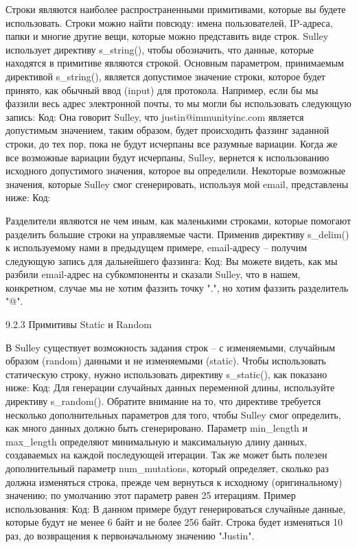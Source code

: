 \documentclass[12pt]{book}
\begin{document}
Строки являются наиболее распространенными примитивами, которые вы будете использовать. Строки можно найти повсюду: имена пользователей, IP-адреса, папки и многие другие вещи, которые можно представить виде строк. Sulley использует директиву s\_string(), чтобы обозначить, что данные, которые находятся в примитиве являются строкой. Основным параметром, принимаемым директивой s\_string(), является допустимое значение строки, которое будет принято, как обычный ввод (input) для протокола. Например, если бы мы фаззили весь адрес электронной почты, то мы могли бы использовать следующую запись:
Код:
Она говорит Sulley, что justin@immunityinc.com является допустимым значением, таким образом, будет происходить фаззинг заданной строки, до тех пор, пока не будут исчерпаны все разумные вариации. Когда же все возможные вариации будут исчерпаны, Sulley, вернется к использованию исходного допустимого значения, которое вы определили. Некоторые возможные значения, которые Sulley смог сгенерировать, используя мой email, представлены ниже:
Код:

Разделители являются не чем иным, как маленькими строками, которые помогают разделить большие строки на управляемые части. Применив директиву s\_delim() к используемому нами в предыдущем примере, email-адресу – получим следующую запись для дальнейшего фаззинга:
Код:
Вы можете видеть, как мы разбили email-адрес на субкомпоненты и сказали Sulley, что в нашем, конкретном, случае мы не хотим фаззить точку ".", но хотим фаззить разделитель "@". 

9.2.3 Примитивы Static и Random

В Sulley существует возможность задания строк – с изменяемыми, случайным образом (random) данными и не изменяемыми (static). Чтобы использовать статическую строку, нужно использовать директиву s\_static(), как показано ниже:
Код:
Для генерации случайных данных переменной длины, используйте директиву s\_random(). Обратите внимание на то, что директиве требуется несколько дополнительных параметров для того, чтобы Sulley смог определить, как много данных должно быть сгенерировано. Параметр min\_length и max\_length определяют минимальную и максимальную длину данных, создаваемых на каждой последующей итерации. Так же может быть полезен дополнительный параметр num\_mutations, который определяет, сколько раз должна изменяться строка, прежде чем вернуться к исходному (оригинальному) значению; по умолчанию этот параметр равен 25 итерациям. Пример использования:
Код:
В данном примере будут генерироваться случайные данные, которые будут не менее 6 байт и не более 256 байт. Строка будет изменяться 10 раз, до возвращения к первоначальному значению "Justin".
\end{document}
